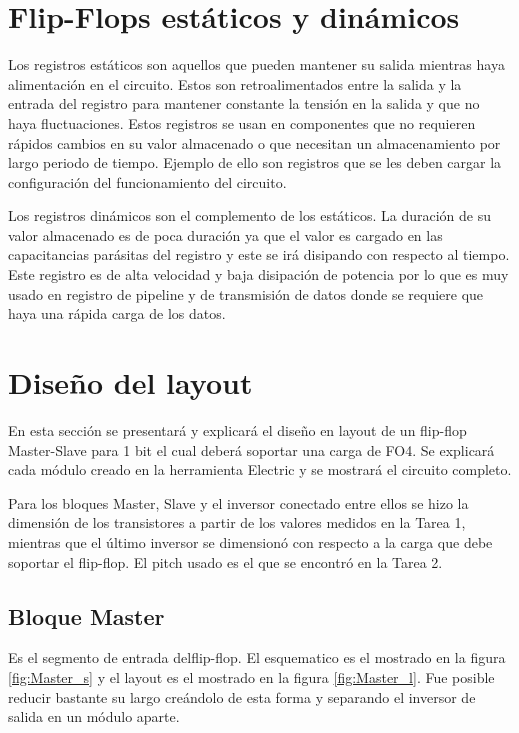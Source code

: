 \documentclass[12pt,a4paper]{article} %
\begin{document}
\section{Flip-Flops estáticos y dinámicos}


Los registros estáticos son aquellos que pueden mantener su salida mientras haya alimentación en el circuito. Estos son retroalimentados entre la salida y la entrada del registro para mantener constante la tensión en la salida y que no haya fluctuaciones.  
Estos registros se usan en componentes que no requieren rápidos cambios en su valor almacenado o que necesitan un almacenamiento por largo periodo de tiempo. Ejemplo de ello son registros que se les deben cargar la configuración del funcionamiento del circuito.

Los registros dinámicos son el complemento de los estáticos. La duración de su valor almacenado es de poca duración ya que el valor es cargado en las capacitancias parásitas del registro y este se irá disipando con respecto al tiempo. Este registro es de alta velocidad y baja disipación de potencia por lo que es muy usado en registro de pipeline y de transmisión de datos donde se requiere que haya una rápida carga de los datos.


\section{Diseño del layout}

En esta sección se presentará y explicará el diseño en layout de un flip-flop Master-Slave para 1 bit el cual deberá soportar una carga de FO4. Se explicará cada módulo creado en la herramienta Electric y se mostrará el circuito completo.

Para los bloques Master, Slave y el inversor conectado entre ellos se hizo la dimensión de los transistores a partir de los valores medidos en la Tarea 1, mientras que el último inversor se dimensionó con respecto a la carga que debe soportar el flip-flop. El pitch usado es el que se encontró en la Tarea 2. 

\subsection{Bloque Master}

Es el segmento de entrada delflip-flop. El esquematico es el mostrado en la figura \ref{fig:Master_s} y el layout es el mostrado en la figura \ref{fig:Master_l}. Fue posible reducir bastante su largo creándolo de esta forma y separando el inversor de salida en un módulo aparte. 
\end{document}
